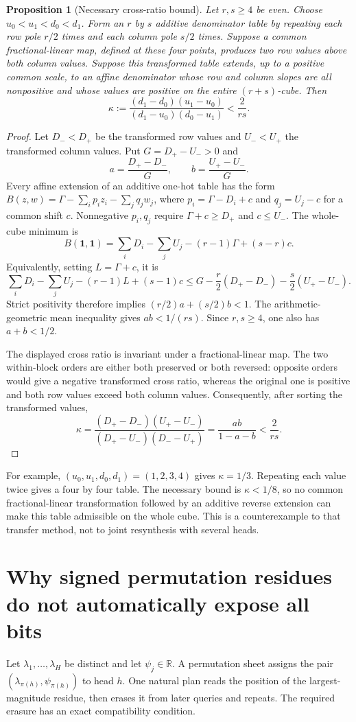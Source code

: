 \documentclass[11pt]{article}
\newtheorem{proposition}{Proposition}
\begin{document}
\begin{proposition}[Necessary cross-ratio bound]
Let $r,s\geq4$ be even. Choose $u_0<u_1<d_0<d_1$. Form an $r$ by $s$
additive denominator table by repeating each row pole $r/2$ times and
each column pole $s/2$ times. Suppose a common fractional-linear map,
defined at these four points, produces two row values above both column
values. Suppose this transformed table extends, up to a positive common
scale, to an affine denominator whose row and column slopes are all
nonpositive and whose values are positive on the entire $(r+s)$-cube.
Then
\[
 \kappa:=\frac{(d_1-d_0)(u_1-u_0)}
 {(d_1-u_0)(d_0-u_1)}<\frac{2}{rs}.
\]
\end{proposition}
\begin{proof}
Let $D_-<D_+$ be the transformed row values and $U_-<U_+$ the
transformed column values. Put $G=D_+-U_->0$ and
\[
 a=\frac{D_+-D_-}{G},\qquad b=\frac{U_+-U_-}{G}.
\]
Every affine extension of an additive one-hot table has the form
$B(z,w)=\Gamma-\sum_i p_i z_i-\sum_jq_jw_j$, where
$p_i=\Gamma-D_i+c$ and $q_j=U_j-c$ for a common shift $c$.
Nonnegative $p_i,q_j$ require $\Gamma+c\geq D_+$ and $c\leq U_-$.
The whole-cube minimum is
\[
 B(\mathbf1,\mathbf1)
 =\sum_iD_i-\sum_jU_j-(r-1)\Gamma+(s-r)c.
\]
Equivalently, setting $L=\Gamma+c$, it is
\[
 \sum_iD_i-\sum_jU_j-(r-1)L+(s-1)c
 \leq G-\frac r2(D_+-D_-)-\frac s2(U_+-U_-).
\]
Strict positivity therefore implies $(r/2)a+(s/2)b<1$.
The arithmetic-geometric mean inequality gives $ab<1/(rs)$.
Since $r,s\geq4$, one also has $a+b<1/2$.

The displayed cross ratio is invariant under a fractional-linear map.
The two within-block orders are either both preserved or both reversed:
opposite orders would give a negative transformed cross ratio, whereas
the original one is positive and both row values exceed both column
values. Consequently, after sorting the transformed values,
\[
 \kappa=\frac{(D_+-D_-)(U_+-U_-)}
 {(D_+-U_-)(D_--U_+)}=\frac{ab}{1-a-b}
 <\frac2{rs}.
\]
\end{proof}

For example, $(u_0,u_1,d_0,d_1)=(1,2,3,4)$ gives $\kappa=1/3$.
Repeating each value twice gives a four by four table. The necessary
bound is $\kappa<1/8$, so no common fractional-linear transformation
followed by an additive reverse extension can make this table admissible
on the whole cube. This is a counterexample to that transfer method,
not to joint resynthesis with several heads.

\section{Why signed permutation residues do not automatically expose all bits}
Let $\lambda_1,\ldots,\lambda_H$ be distinct and let
$\psi_j\in\mathbb R$. A permutation sheet assigns the pair
$(\lambda_{\pi(h)},\psi_{\pi(h)})$ to head $h$.
One natural plan reads the position of the largest-magnitude residue,
then erases it from later queries and repeats. The required erasure
has an exact compatibility condition.
\end{document}
